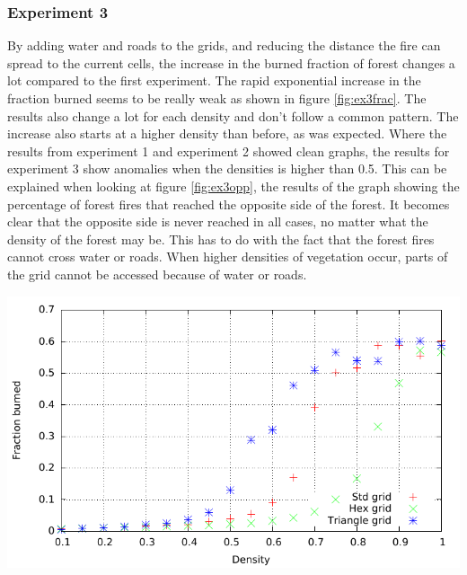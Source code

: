\documentclass{article}
\newenvironment{Figure}
  {\par\medskip\noindent\minipage{\linewidth}}
  {\endminipage\par\medskip}
\begin{document}
\begin{multicols}{2}
\subsubsection*{Experiment 3}
By adding water and roads to the grids, and reducing the distance the fire can spread to the current cells, the increase in the burned fraction of forest changes a lot compared to the first experiment. The rapid exponential increase in the fraction burned seems to be really weak as shown in figure \ref{fig:ex3frac}. The results also change a lot for each density and don't follow a common pattern. The increase also starts at a higher density than before, as was expected. Where the results from experiment 1 and experiment 2 showed clean graphs, the results for experiment 3 show anomalies when the densities is higher than 0.5. This can be explained when looking at figure \ref{fig:ex3opp}, the results of the graph showing the percentage of forest fires that reached the opposite side of the forest. It becomes clear that the opposite side is never reached in all cases, no matter what the density of the forest may be. This has to do with the fact that the forest fires cannot cross water or roads. When higher densities of vegetation occur, parts of the grid cannot be accessed because of water or roads.
\begin{Figure}
 \centering
 \includegraphics[width=\textwidth]{imgs/plot/ex3/fracburned.pdf}
\label{fig:ex3frac}
\end{Figure}


\end{multicols}
\end{document}
